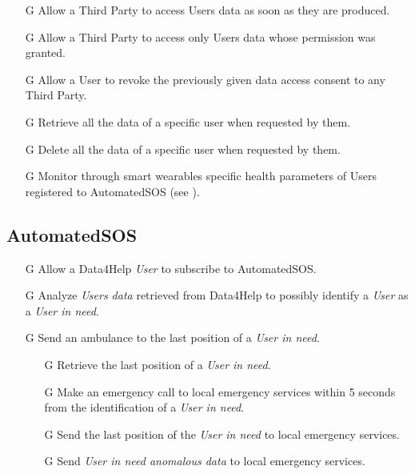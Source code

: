 \documentclass[../../rasd.tex]{subfiles}
\begin{document}
\begin{itemize}
\begin{itemize}
							\end{itemize}								
						\item[G\subs{6}]Allow a Third Party to access Users data as soon as they are produced.
						\item[G\subs{7}]Allow a Third Party to access only Users data whose permission was granted.
						
						\item[G\subs{8}]Allow a User to revoke the previously given data access consent to any Third Party.
						\item[G\subs{9}]Retrieve all the data of a specific user when requested by them.
						\item[G\subs{10}]Delete all the data of a specific user when requested by them.

						\item[G\subs{11}]Monitor through smart wearables specific health parameters of Users registered to AutomatedSOS (see ).
					\end{itemize}



				\subsection{AutomatedSOS}
					\begin{itemize}
						\item[G\subs{12}]Allow a Data4Help \textit{User} to subscribe to AutomatedSOS.

						\item[G\subs{13}]Analyze \textit{Users data} retrieved from Data4Help to possibly identify a \textit{User} as a \textit{User in need}. 

						\item[G\subs{14}]Send an ambulance to the last position of a \textit{User in need}.
							\begin{itemize}
								\item[G\subs{14.1}]Retrieve the last position of a \textit{User in need}.
								\item[G\subs{14.2}]Make an emergency call to local emergency services within 5 seconds from the identification of a \textit{User in need}.
								\item[G\subs{14.3}]Send the last position of the \textit{User in need} to local emergency services.
								\item[G\subs{14.4}]Send \textit{User in need anomalous data} to local emergency services.
							\end{itemize}
					\end{itemize}
\end{document}

